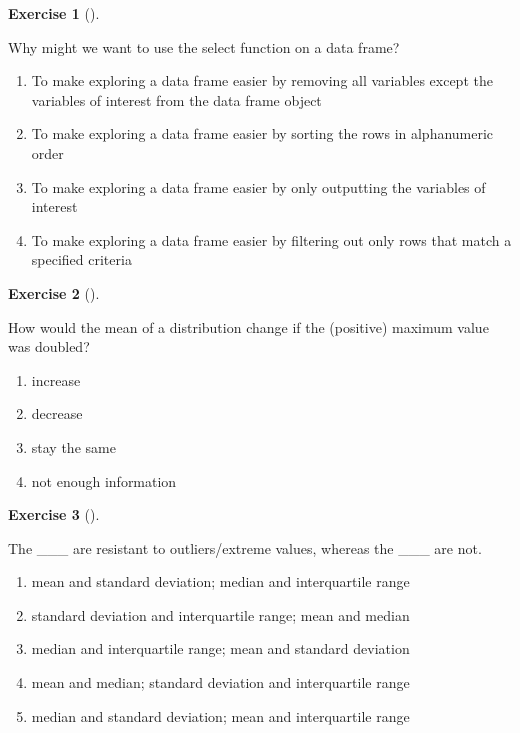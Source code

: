 \documentclass[
  letterpaper,
  DIV=11,
  numbers=noendperiod]{scrreprt}
\providecommand{\tightlist}{%
  \setlength{\itemsep}{0pt}\setlength{\parskip}{0pt}}\usepackage{longtable,booktabs,array}
\theoremstyle{definition}
\newtheorem{exercise}{Exercise}[chapter]
\theoremstyle{remark}
\begin{document}
\leavevmode{}%
\begin{exercise}[]\label{exr-ch03-c04}

Why might we want to use the select function on a data frame?

\begin{enumerate}
\def\labelenumi{\alph{enumi})}
\tightlist
\item
  To make exploring a data frame easier by removing all variables except
  the variables of interest from the data frame object
\item
  To make exploring a data frame easier by sorting the rows in
  alphanumeric order
\item
  To make exploring a data frame easier by only outputting the variables
  of interest
\item
  To make exploring a data frame easier by filtering out only rows that
  match a specified criteria
\end{enumerate}

\end{exercise}

\leavevmode{}%
\begin{exercise}[]\label{exr-ch03-c05}

How would the mean of a distribution change if the (positive) maximum
value was doubled?

\begin{enumerate}
\def\labelenumi{\alph{enumi})}
\tightlist
\item
  increase
\item
  decrease
\item
  stay the same
\item
  not enough information
\end{enumerate}

\end{exercise}

\leavevmode{}%
\begin{exercise}[]\label{exr-ch03-c06}

The \_\_\_ are resistant to outliers/extreme values, whereas the \_\_\_
are not.

\begin{enumerate}
\def\labelenumi{\alph{enumi})}
\tightlist
\item
  mean and standard deviation; median and interquartile range
\item
  standard deviation and interquartile range; mean and median
\item
  median and interquartile range; mean and standard deviation
\item
  mean and median; standard deviation and interquartile range
\item
  median and standard deviation; mean and interquartile range
\end{enumerate}

\end{exercise}
\end{document}
